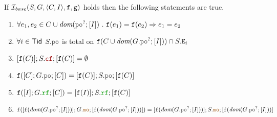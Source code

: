 \documentclass[12pt]{article}
\begin{document}
\begin{prop}
  If $\mathcal{I}_{base}(S, G, \langle C, I \rangle, {\mathtt{f}}, {\mathtt{g}})$ holds then the following statements are true.
  \begin{enumerate}[label=\textbf{P.1.\arabic*.},align=left]

    \item \label{item:sim-finj-ext}
    $\forall{e_1, e_2 \in C \cup \dom{\lPO^?;[I]}} ~.~ \f(e_1) = \f(e_2) \Rightarrow e_1 = e_2$
        
    \item \label{item:sim-po-tot-ext}
    $\forall{i \in \mathsf{Tid}}$
    $S.\lPO$ is total on $\f(C \cup \dom{G.\lPO^?;[I]}) \cap S.\lEi{i}$

    \item \label{item:sim-ncf}
    $[\f(C)];S.\lCF;[\f(C)] = \emptyset$
    
    \item \label{item:sim-po-eq}
    $\f([C];G.\lPO;[C]) = [\f(C)];S.\lPO;[\f(C)]$

    \item \label{item:sim-rf-eq}
    $\f([I];G.\lRF;[C]) = [\f(I)];S.\lRF;[\f(C)]$
    
    \item \label{item:sim-mo-eq}
    $\f([\f(\dom{G.\lPO^?;[I]})];G.\lMO;[\f(\dom{G.\lPO^?;[I]})]) =
        [\f(\dom{G.\lPO^?;[I]})];S.\lMO;[\f(\dom{G.\lPO^?;[I]})]$
    
  \end{enumerate}
\end{prop}




\end{document}
